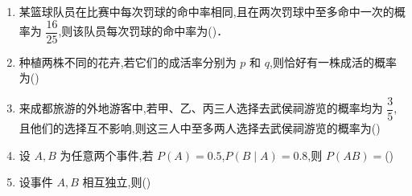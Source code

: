 \begin{enumerate}
  \item  某篮球队员在比赛中每次罚球的命中率相同,且在两次罚球中至多命中一次的概率为 $\dfrac{16}{25}$,则该队员每次罚球的命中率为(\quad)．

  \item  种植两株不同的花卉,若它们的成活率分别为 $p$ 和 $q$,则恰好有一株成活的概率为(\quad)

  \item  来成都旅游的外地游客中,若甲、乙、丙三人选择去武侯祠游览的概率均为 $\dfrac{3}{5}$,且他们的选择互不影响,则这三人中至多两人选择去武侯祠游览的概率为(\quad)

  \item  设 $A,B$ 为任意两个事件,若 $P(A)=0.5$,$P(B\mid A)=0.8$,则 $P(AB)=$(\quad)

  \item  设事件 $A,B$ 相互独立,则(\quad)


\end{enumerate}
